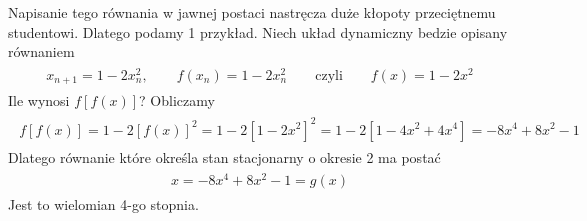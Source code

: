 \documentclass[a4paper,12pt,polish]{sphinxmanual}
\begin{document}
Napisanie tego równania w jawnej postaci nastręcza duże kłopoty przeciętnemu studentowi. Dlatego podamy 1 przykład. Niech układ dynamiczny bedzie opisany równaniem
\label{ch1/chI031:equation-eqn30}\begin{gather}
\begin{split}x_{n+1} = 1- 2 x_n^2, \qquad f(x_n) = 1 - 2 x_n^2 \qquad \mbox{czyli} \qquad f(x) = 1 - 2 x^2\end{split}\label{ch1/chI031-eqn30}
\end{gather}
Ile wynosi $f[f(x)]$? Obliczamy
\label{ch1/chI031:equation-eqn31}\begin{gather}
\begin{split}f[f(x)] = 1 - 2 [f(x)]^2  =  1 - 2 [1 - 2 x^2]^2 = 1 - 2[1 - 4 x^2 + 4 x^4] = -8 x^4 + 8 x^2 -1\end{split}\label{ch1/chI031-eqn31}
\end{gather}
Dlatego równanie które określa stan stacjonarny o okresie 2 ma postać
\label{ch1/chI031:equation-eqn32}\begin{gather}
\begin{split}x = -8 x^4 + 8 x^2 -1 = g(x)\end{split}\label{ch1/chI031-eqn32}
\end{gather}
Jest to wielomian 4-go stopnia.
\end{document}
